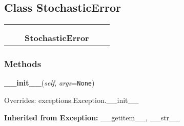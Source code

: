 
\subsection{Class StochasticError}

    \label{stochastic:StochasticError}
\begin{tabular}{cccccc}
\multicolumn{2}{r}{\settowidth{\BCL}{exceptions.Exception}\multirow{2}{\BCL}{exceptions.Exception}}
&&
  \\\cline{3-3}
  &&\multicolumn{1}{c|}{}
&&
  \\
&&\multicolumn{2}{l}{\textbf{StochasticError}}
\end{tabular}



  \subsubsection{Methods}

    \label{stochastic:StochasticError:__init__}
    \vspace{0.5ex}

    \begin{boxedminipage}{\textwidth}

    \raggedright \textbf{\_\_init\_\_}(\textit{self}, \textit{args}=\texttt{N\-o\-n\-e\-})

      Overrides: exceptions.Exception.\_\_init\_\_

    \end{boxedminipage}

  \textbf{Inherited from Exception:}
    \_\_getitem\_\_,
    \_\_str\_\_


